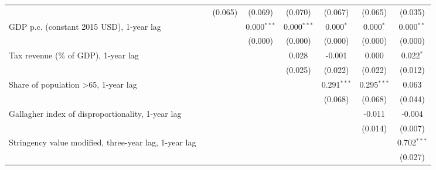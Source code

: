 \begin{table}[htbp]
\begin{tabular}{lccccccc}
                                                                                               &             & (0.065)     & (0.069)       & (0.070)       & (0.067)       & (0.065)       & (0.035)\\   
      GDP p.c. (constant 2015 USD), 1-year lag                                                 &             &             & 0.000$^{***}$ & 0.000$^{***}$ & 0.000$^{*}$   & 0.000$^{*}$   & 0.000$^{**}$\\   
                                                                                               &             &             & (0.000)       & (0.000)       & (0.000)       & (0.000)       & (0.000)\\   
      Tax revenue (\% of GDP), 1-year lag                                                      &             &             &               & 0.028         & -0.001        & 0.000         & 0.022$^{*}$\\   
                                                                                               &             &             &               & (0.025)       & (0.022)       & (0.022)       & (0.012)\\   
      Share of population >65, 1-year lag                                                      &             &             &               &               & 0.291$^{***}$ & 0.295$^{***}$ & 0.063\\   
                                                                                               &             &             &               &               & (0.068)       & (0.068)       & (0.044)\\   
      Gallagher index of disproportionality, 1-year lag                                        &             &             &               &               &               & -0.011        & -0.004\\   
                                                                                               &             &             &               &               &               & (0.014)       & (0.007)\\   
      Stringency value modified, three-year lag, 1-year lag                                    &             &             &               &               &               &               & 0.702$^{***}$\\   
                                                                                               &             &             &               &               &               &               & (0.027)\\   

\end{tabular}
\end{table}

